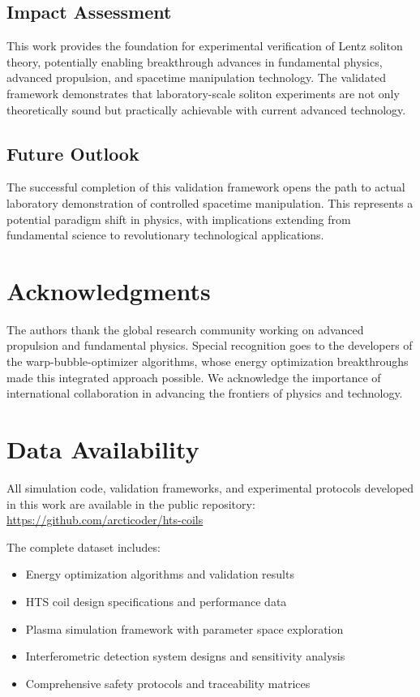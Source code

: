 \documentclass[12pt,a4paper]{article}
\begin{document}
\subsection{Impact Assessment}
This work provides the foundation for experimental verification of Lentz soliton theory, potentially enabling breakthrough advances in fundamental physics, advanced propulsion, and spacetime manipulation technology. The validated framework demonstrates that laboratory-scale soliton experiments are not only theoretically sound but practically achievable with current advanced technology.

\subsection{Future Outlook}
The successful completion of this validation framework opens the path to actual laboratory demonstration of controlled spacetime manipulation. This represents a potential paradigm shift in physics, with implications extending from fundamental science to revolutionary technological applications.

\section*{Acknowledgments}

The authors thank the global research community working on advanced propulsion and fundamental physics. Special recognition goes to the developers of the warp-bubble-optimizer algorithms, whose energy optimization breakthroughs made this integrated approach possible. We acknowledge the importance of international collaboration in advancing the frontiers of physics and technology.

\section*{Data Availability}

All simulation code, validation frameworks, and experimental protocols developed in this work are available in the public repository: \url{https://github.com/arcticoder/hts-coils}

The complete dataset includes:
\begin{itemize}
\item Energy optimization algorithms and validation results
\item HTS coil design specifications and performance data
\item Plasma simulation framework with parameter space exploration
\item Interferometric detection system designs and sensitivity analysis
\item Comprehensive safety protocols and traceability matrices
\end{itemize}
\end{document}
